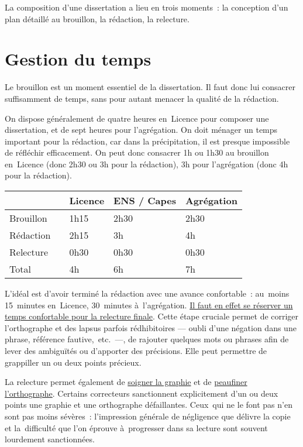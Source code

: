 \documentclass[a4paper,12pt]{report}
\begin{document}
La composition d'une dissertation a lieu en trois moments : la
conception d'un plan détaillé au brouillon, la rédaction, la relecture.

\chapter{Gestion du temps}
\label{sec:orgee5b2b7}

Le brouillon est un moment essentiel de la dissertation. Il faut donc
lui consacrer suffisamment de temps, sans pour autant menacer la qualité
de la rédaction.

On dispose généralement de quatre heures en Licence pour composer une
dissertation, et de sept heures pour l'agrégation. On doit ménager un
temps important pour la rédaction, car dans la précipitation, il est
presque impossible de réfléchir efficacement. On peut donc consacrer 1h
ou 1h30 au brouillon en Licence (donc 2h30 ou 3h pour la rédaction), 3h
pour l'agrégation (donc 4h pour la rédaction).

\begin{center}
\begin{tabular}{|l|l|l|l|l|}
\hline
 &  & Licence & ENS / Capes & Agrégation\\[0pt]
\hline
\hline
Brouillon &  & 1h15 & 2h30 & 2h30\\[0pt]
Rédaction &  & 2h15 & 3h & 4h\\[0pt]
Relecture &  & 0h30 & 0h30 & 0h30\\[0pt]
\hline
\hline
Total &  & 4h & 6h & 7h\\[0pt]
\hline
\end{tabular}
\end{center}

L'idéal est d'avoir terminé la rédaction avec une avance confortable :
au moins 15 minutes en Licence, 30 minutes à l'agrégation. \uline{Il faut en
effet se réserver un temps confortable pour la relecture finale}. Cette
étape cruciale permet de corriger l'orthographe et des lapsus parfois
rédhibitoires — oubli d'une négation dans une phrase, référence
fautive, etc. —, de rajouter quelques mots ou phrases afin de lever des
ambiguïtés ou d'apporter des précisions. Elle peut permettre de
grappiller un ou deux points précieux.

La relecture permet également de \uline{soigner la graphie} et de \uline{peaufiner
l'orthographe}. Certains correcteurs sanctionnent explicitement d'un ou
deux points une graphie et une orthographe défaillantes. Ceux qui ne le
font pas n'en sont pas moins sévères : l'impression générale de
négligence que délivre la copie et la difficulté que l'on éprouve
à progresser dans sa lecture sont souvent lourdement sanctionnées.
\end{document}
